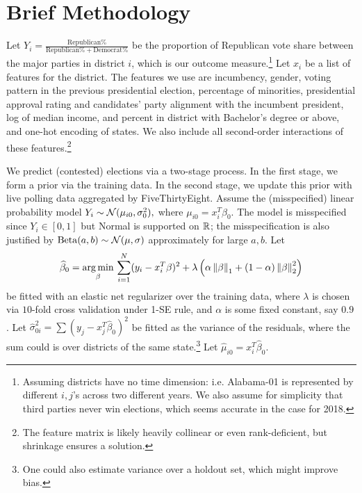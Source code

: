 \documentclass[12pt]{article}
\begin{document}
\section*{Brief Methodology}
Let $Y_i = \frac{\text{Republican}\% }{\text{Republican}\% + \text{Democrat}\%}$ be the proportion of Republican vote share between the major parties in district $i$, which is our outcome measure.\footnote{Assuming districts have no time dimension: i.e. Alabama-01 is represented by different $i,j$'s across two different years. We also assume for simplicity that third parties never win elections, which seems accurate in the case for 2018.} Let $x_i$ be a list of features for the district. The features we use are incumbency, gender, voting pattern in the previous presidential election, percentage of minorities, presidential approval rating and candidates' party alignment with the incumbent president, log of median income, and percent in district with Bachelor's degree or above, and one-hot encoding of states. We also include all second-order interactions of these features.\footnote{The feature matrix is likely heavily collinear or even rank-deficient, but shrinkage ensures a solution.}

We predict (contested) elections via a two-stage process. In the first stage, we form a prior via the training data. In the second stage, we update this prior with live polling data aggregated by FiveThirtyEight. Assume the (misspecified) linear probability model
$Y_i \sim \mathcal{N}(\mu_{i0}, \sigma_0^2),$ where $\mu_{i0} = x_i^T \beta_0$. The model is misspecified since $Y_i \in [0,1]$ but Normal is supported on $\mathbb{R}$; the misspecification is also justified by $\operatorname{Beta}(a,b) \sim \mathcal{N}(\mu, \sigma)$ approximately for large $a,b$. Let \begin{align*}
\widehat \beta_0 = \operatorname*{arg\,min}_\beta \, \sum_{i=1}^{N} (y_i - x_i^T \beta)^2 + \lambda\left({\alpha \left\lVert\beta\right\rVert_1 + (1-\alpha) \left\lVert\beta\right\rVert_2^2}\right)
\end{align*}
be fitted with an elastic net regularizer over the training data, where $\lambda$ is chosen via $10$-fold cross validation under 1-SE rule, and $\alpha$ is some fixed constant, say $0.9$. Let $\hat \sigma_{0i}^2 = \sum (y_j - x_j^T \hat\beta_0)^2$ be fitted as the variance of the residuals, where the sum could is over districts of the same state.\footnote{One could also estimate variance over a holdout set, which might improve bias.} Let $\hat \mu_{i0} = x_i^T \hat \beta_0$.
\end{document}
